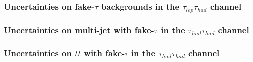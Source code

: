 \subsubsection{Uncertainties on fake-$\tau$ backgrounds in the $\tau_{lep}\tau_{had}$ channel}
\label{subsec:uncertainties_lephadfakes}



\subsubsection{Uncertainties on multi-jet with fake-$\tau$ in the $\tau_{had}\tau_{had}$ channel}
\label{subsec:uncertainties_hadhamultijetfakes}



\subsubsection{Uncertainties on $t\bar{t}$ with fake-$\tau$ in the $\tau_{had}\tau_{had}$ channel}
\label{subsec:uncertainties_hadhadttbarfakes}


